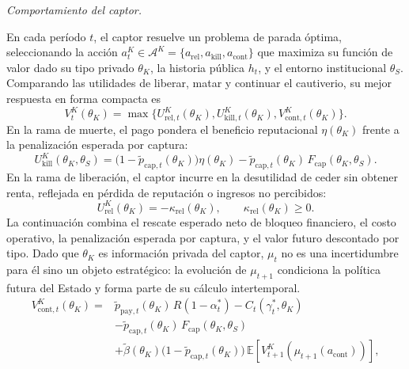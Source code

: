 \documentclass[review,authoryear,12pt]{elsarticle}
\theoremstyle{plain}
\theoremstyle{definition}
\newcommand{\E}{\mathbb{E}}
\newcommand{\1}{\mathbf{1}}
\begin{document}
\noindent\textit{Comportamiento del captor.}

\noindent En cada período $t$, el captor resuelve un problema de parada óptima, seleccionando la acción $a_t^K\in\mathcal{A}^K=\{a_{\mathrm{rel}},a_{\mathrm{kill}},a_{\mathrm{cont}}\}$ que maximiza su función de valor dado su tipo privado $\theta_K$, la historia pública $h_t$, y el entorno institucional $\theta_S$. Comparando las utilidades de liberar, matar y continuar el cautiverio, su mejor respuesta en forma compacta es
\begin{equation}
V^K_t(\theta_K)=
\max\{U^K_{\mathrm{rel},t}(\theta_K),
U^K_{\mathrm{kill},t}(\theta_K),
V^K_{\mathrm{cont},t}(\theta_K)\}.
\label{eq:k-bellman}
\end{equation}
En la rama de muerte, el pago pondera el beneficio reputacional $\eta(\theta_K)$ frente a la penalización esperada por captura:
\begin{equation}
U^K_{\mathrm{kill}}(\theta_K,\theta_S)=\bigl(1-\tilde{p}_{\mathrm{cap},t}(\theta_K)\bigr)\eta(\theta_K)-\tilde{p}_{\mathrm{cap},t}(\theta_K)\,F_{\mathrm{cap}}(\theta_K,\theta_S).
\label{eq:k-kill}
\end{equation}
En la rama de liberación, el captor incurre en la desutilidad de ceder sin obtener renta, reflejada en pérdida de reputación o ingresos no percibidos:
\begin{equation}
U^K_{\mathrm{rel}}(\theta_K)=-\kappa_{\mathrm{rel}}(\theta_K),\qquad\kappa_{\mathrm{rel}}(\theta_K)\ge 0.
\label{eq:k-rel}
\end{equation}
La continuación combina el rescate esperado neto de bloqueo financiero, el costo operativo, la penalización esperada por captura, y el valor futuro descontado por tipo. Dado que $\theta_K$ es información privada del captor, $\mu_t$ no es una incertidumbre para él sino un objeto estratégico: la evolución de $\mu_{t+1}$ condiciona la política futura del Estado y forma parte de su cálculo intertemporal.
\begin{equation}
\begin{aligned}
V^K_{\mathrm{cont},t}(\theta_K)
={}&\tilde{p}_{\mathrm{pay},t}(\theta_K)\,R(1-\alpha_t^\ast)
-C_t(\gamma_t^\ast,\theta_K)\\
&-\tilde{p}_{\mathrm{cap},t}(\theta_K)\,F_{\mathrm{cap}}(\theta_K,\theta_S)\\
&+\tilde{\beta}(\theta_K)\bigl(1-\tilde{p}_{\mathrm{cap},t}(\theta_K)\bigr)\,\E\!\left[V^K_{t+1}\!\left(\mu_{t+1}(a_{\mathrm{cont}})\right)\right],
\end{aligned}
\label{eq:kidnapper-cont}
\end{equation}
\end{document}
